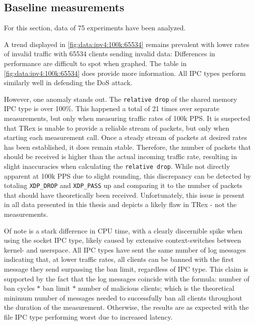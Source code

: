 \subsection{Baseline measurements}
For this section, data of 75 experiments have been analyzed.

A trend displayed in \ref{fig:data:ipv4:100k:65534} remains prevalent with lower rates of invalid traffic with 65534 clients sending invalid data:
Differences in performance are difficult to spot when graphed.
The table in \ref{fig:data:ipv4:100k:65534} does provide more information.
All \ac{IPC} types perform similarly well in defending the \ac{DoS} attack.

However, one anomaly stands out.
The \texttt{relative drop} of the shared memory \ac{IPC} type is over 100\%.
This happened a total of 21 times over separate measurements, but only when measuring traffic rates of 100k \ac{PPS}.
It is suspected that TRex is unable to provide a reliable stream of packets, but only when starting each measurement call.
Once a steady stream of packets at desired rates has been established, it does remain stable.
Therefore, the number of packets that should be received is higher than the actual incoming traffic rate, resulting in slight inaccuracies when calculating the \texttt{relative drop}.
While not directly apparent at 100k \ac{PPS} due to slight rounding, this discrepancy can be detected by totaling \texttt{XDP\_DROP} and \texttt{XDP\_PASS} up and comparing it to the number of packets that should have theoretically been received.
Unfortunately, this issue is present in all data presented in this thesis and depicts a likely flaw in TRex - not the measurements.

Of note is a stark difference in \ac{CPU} time, with a clearly discernible spike when using the socket \ac{IPC} type, likely caused by extensive context-switches between kernel- and userspace.
All \ac{IPC} types have sent the same number of log messages indicating that, at lower traffic rates, all clients can be banned with the first message they send surpassing the ban limit, regardless of \ac{IPC} type.
This claim is supported by the fact that the log messages coincide with the formula:
number of ban cycles $*$ ban limit $*$ number of malicious clients;
which is the theoretical minimum number of messages needed to successfully ban all clients throughout the duration of the measurement. 
Otherwise, the results are as expected with the file \ac{IPC} type performing worst due to increased latency.

